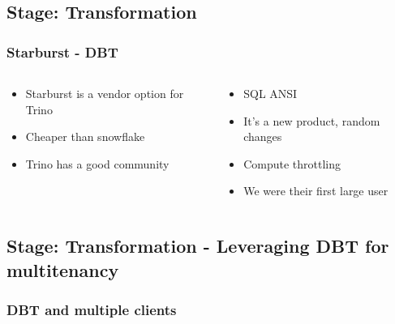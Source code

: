 \documentclass{beamer}
\begin{document}
\subsection{Stage: Transformation}
\begin{frame}
    \frametitle{Starburst - DBT}
    \begin{columns}
        \begin{column}{0.5\textwidth}
            \begin{itemize}
                \item Starburst is a vendor option for Trino
                \item Cheaper than snowflake
                \item Trino has a good community
            \end{itemize}
        \end{column}
        \begin{column}{0.5\textwidth}
            \begin{itemize}
                \item SQL ANSI
                \item It's a new product, random changes
                \item Compute throttling
                \item We were their first large user
            \end{itemize}
        \end{column}
    \end{columns}
\end{frame}

\subsection{Stage: Transformation - Leveraging DBT for multitenancy}

\begin{frame}
    \frametitle{DBT and multiple clients}
    \begin{columns}
    \begin{column}}{0.5\textwidth}
        \begin{verbatim}
        SELECT
            AÑO AS year
            , TRIMESTER AS trimester
            , PROVEEDOR AS provider
            , "LINEAS EN SERVICIO" AS lines_in_service
            , "LINEAS PREPAGO" AS prepaid_lines
            , "LINEAS POSPAGO" AS postpaid_lines
            , "LINEAS ACTIVADAS" AS enabled_lines
            , "LINEAS RETIRADAS" AS retired_lines
        FROM {{ ref('mobile_phone_subscribers_by_category')}}
        WHERE PROVEEDOR = '{{ var("client")}}'
        \end{verbatim}
    \end{column}
    \begin{column}}{0.5\textwidth}

    \end{column}
    \end{columns}
\end{frame}
\end{document}

